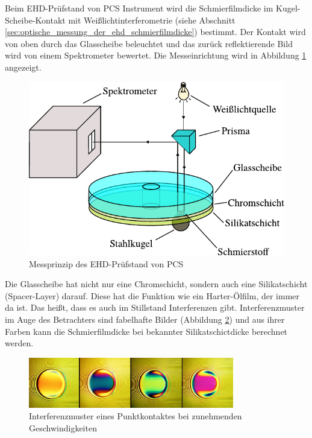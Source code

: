 Beim EHD-Prüfstand von PCS Instrument wird die Schmierfilmdicke im Kugel-Scheibe-Kontakt mit Weißlichtinterferometrie (siehe Abschnitt \ref{sec:optische_messung_der_ehd_schmierfilmdicke}) bestimmt.
Der Kontakt wird von oben durch das Glasscheibe beleuchtet und das zurück reflektierende Bild wird von einem Spektrometer bewertet.
Die Messeinrichtung wird in Abbildung \ref{fig:ehl_messprinzip} angezeigt.
\begin{figure}[htb]
    \centering
    \includegraphics[]{./images/ehd_messprinzip.pdf}
    \caption{Messprinzip des EHD-Prüfstand von PCS \cite{mach_2008}}
    \label{fig:ehl_messprinzip}
\end{figure}
%

Die Glasscheibe hat nicht nur eine Chromschicht, sondern auch eine Silikatschicht (Spacer-Layer) darauf.
Diese hat die Funktion wie ein Harter-Ölfilm, der immer da ist. Das heißt, dass es auch im Stillstand Interferenzen gibt.
Interferenzmuster im Auge des Betrachters sind fabelhafte Bilder (Abbildung \ref{fig:ehl_bilder}) und aus ihrer Farben kann die Schmierfilmdicke bei bekannter Silikatschictdicke berechnet werden.
\begin{figure}[htb]
    \centering
    \includegraphics[width=0.8\textwidth]{./images/ehl_contact_at_increasing_speeds.png}
    \caption{Interferenzmuster eines Punktkontaktes bei zunehmenden Geschwindigkeiten \cite{ehl_broshure}}
    \label{fig:ehl_bilder}
\end{figure}
%

